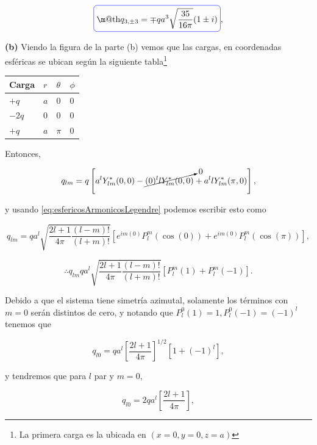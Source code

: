 \documentclass[a4paper,11pt]{article}
\makeatletter
\numberwithin{equation}{section}
\newcommand*{\boxcolor}{blue}
\renewcommand{\boxed}[1]{\textcolor{\boxcolor}{%
\tikz[baseline={([yshift=-1ex]current bounding box.center)}] \node [rectangle, minimum width=1ex,rounded corners,draw] {\normalcolor\m@th$\displaystyle#1$};}}
\makeatother
\begin{document}
\begin{equation}
 \boxed{q_{3,\pm 3} = \mp qa^3\sqrt{\frac{35}{16\pi}} (1 \pm i)},
\end{equation}

\newpage

\textbf{(b)} Viendo la figura de la parte (b) vemos que las cargas, en coordenadas 
esféricas se ubican según la siguiente tabla\footnote{La primera carga es la ubicada 
en $(x=0,y=0,z=a)$}

\begin{table}[H]
\centering
\begin{tabular}{|l|l|l|l|}
\hline
Carga 	& $r$ & $\theta$ & $\phi$   \\ \hline
$+q$    & $a$ & $0$ 	 & $0$      \\ \hline
$-2q$   & $0$ & $0$	 & $0$  \\ \hline
$+q$    & $a$ & $\pi$  	 & $0$    \\ \hline
\end{tabular}
\end{table}

Entonces, 

\begin{equation}
 q_{lm} = q\left[a^lY^*_{lm}(0,0) - \cancelto{0}{(0)^l lY^*_{lm}(0,0)} + 
 a^llY^*_{lm}(\pi,0)\right],
\end{equation}

y usando \eqref{eq:esfericosArmonicosLegendre} podemos escribir esto como 

\begin{equation}
 q_{lm} = qa^l\sqrt{\frac{2l+1}{4\pi}\frac{(l-m)!}{(l+m)!}} 
 \left[ e^{im(0)}P_l^m(\cos(0)) + e^{im(0)}P_l^m(\cos(\pi)) \right],
\end{equation}

\begin{equation}
 \therefore q_{lm}qa^l\sqrt{\frac{2l+1}{4\pi}\frac{(l-m)!}{(l+m)!}} 
 \left[P_l^m(1) + P_l^m(-1) \right].
\end{equation}

Debido a que el sistema tiene simetría azimutal, solamente los términos con 
$m=0$ serán distintos de cero, y notando que $P_l^0(1) = 1, P_l^0(-1) = (-1)^l$ 
tenemos que 

\begin{equation}
 q_{l0} = qa^l\left[\frac{2l+1}{4\pi} \right]^{1/2}[1 + (-1)^l],
\end{equation}

y tendremos que para $l$ par y $m=0$, 

\begin{equation}
 q_{l0} = 2qa^l\left[\frac{2l+1}{4\pi} \right],
 \label{eq:momentoCasoB}
\end{equation}
\end{document}
